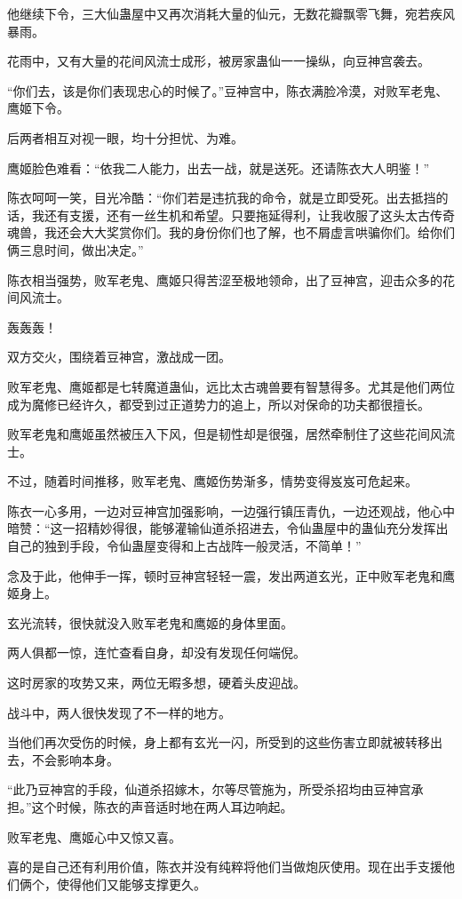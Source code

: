 \begin{this_body}
他继续下令，三大仙蛊屋中又再次消耗大量的仙元，无数花瓣飘零飞舞，宛若疾风暴雨。

花雨中，又有大量的花间风流士成形，被房家蛊仙一一操纵，向豆神宫袭去。

“你们去，该是你们表现忠心的时候了。”豆神宫中，陈衣满脸冷漠，对败军老鬼、鹰姬下令。

后两者相互对视一眼，均十分担忧、为难。

鹰姬脸色难看：“依我二人能力，出去一战，就是送死。还请陈衣大人明鉴！”

陈衣呵呵一笑，目光冷酷：“你们若是违抗我的命令，就是立即受死。出去抵挡的话，我还有支援，还有一丝生机和希望。只要拖延得利，让我收服了这头太古传奇魂兽，我还会大大奖赏你们。我的身份你们也了解，也不屑虚言哄骗你们。给你们俩三息时间，做出决定。”

陈衣相当强势，败军老鬼、鹰姬只得苦涩至极地领命，出了豆神宫，迎击众多的花间风流士。

轰轰轰！

双方交火，围绕着豆神宫，激战成一团。

败军老鬼、鹰姬都是七转魔道蛊仙，远比太古魂兽要有智慧得多。尤其是他们两位成为魔修已经许久，都受到过正道势力的追上，所以对保命的功夫都很擅长。

败军老鬼和鹰姬虽然被压入下风，但是韧性却是很强，居然牵制住了这些花间风流士。

不过，随着时间推移，败军老鬼、鹰姬伤势渐多，情势变得岌岌可危起来。

陈衣一心多用，一边对豆神宫加强影响，一边强行镇压青仇，一边还观战，他心中暗赞：“这一招精妙得很，能够灌输仙道杀招进去，令仙蛊屋中的蛊仙充分发挥出自己的独到手段，令仙蛊屋变得和上古战阵一般灵活，不简单！”

念及于此，他伸手一挥，顿时豆神宫轻轻一震，发出两道玄光，正中败军老鬼和鹰姬身上。

玄光流转，很快就没入败军老鬼和鹰姬的身体里面。

两人俱都一惊，连忙查看自身，却没有发现任何端倪。

这时房家的攻势又来，两位无暇多想，硬着头皮迎战。

战斗中，两人很快发现了不一样的地方。

当他们再次受伤的时候，身上都有玄光一闪，所受到的这些伤害立即就被转移出去，不会影响本身。

“此乃豆神宫的手段，仙道杀招嫁木，尔等尽管施为，所受杀招均由豆神宫承担。”这个时候，陈衣的声音适时地在两人耳边响起。

败军老鬼、鹰姬心中又惊又喜。

喜的是自己还有利用价值，陈衣并没有纯粹将他们当做炮灰使用。现在出手支援他们俩个，使得他们又能够支撑更久。


\end{this_body}
